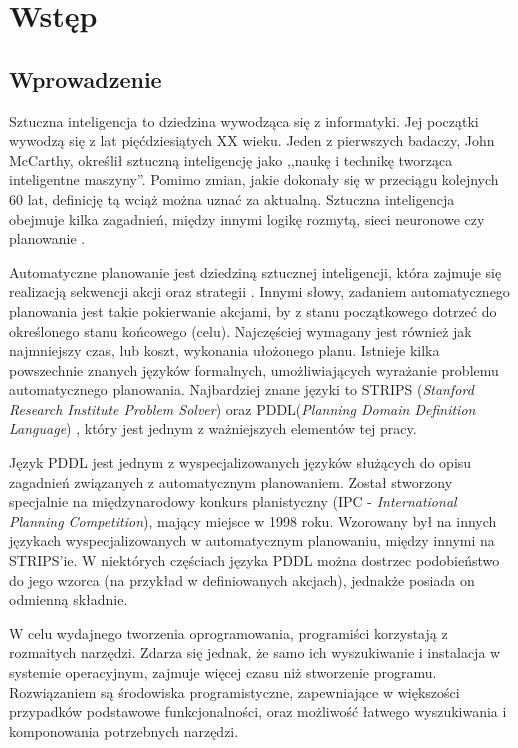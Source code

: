 \chapter{Wstęp}
\section{Wprowadzenie}
Sztuczna inteligencja to dziedzina wywodząca się z informatyki. Jej początki wywodzą się z lat pięćdziesiątych XX wieku. Jeden z pierwszych badaczy,  John McCarthy, określił sztuczną inteligencję jako ,,naukę i technikę tworząca inteligentne maszyny''. Pomimo zmian, jakie dokonały się w przeciągu kolejnych 60 lat, definicję tą wciąż można uznać za aktualną. Sztuczna inteligencja obejmuje kilka zagadnień, między innymi logikę rozmytą, sieci neuronowe czy planowanie \cite{ai}.

	Automatyczne planowanie jest dziedziną sztucznej inteligencji, która zajmuje się realizacją sekwencji akcji oraz strategii \cite{planning}. Innymi słowy, zadaniem automatycznego planowania jest takie pokierwanie akcjami, by z stanu początkowego dotrzeć do określonego stanu końcowego (celu). Najczęściej wymagany jest również jak najmniejszy czas, lub koszt, wykonania ułożonego planu. Istnieje kilka powszechnie znanych języków formalnych, umożliwiających wyrażanie problemu automatycznego planowania. Najbardziej znane języki to STRIPS (\textit{Stanford Research Institute Problem Solver}) \cite{strips} oraz PDDL(\textit{Planning Domain Definition Language}) \cite{pddl}, który jest jednym z ważniejszych elementów tej pracy.
	
	Język PDDL jest jednym z wyspecjalizowanych języków służących do opisu zagadnień związanych z automatycznym planowaniem. Został stworzony specjalnie na międzynarodowy konkurs planistyczny (IPC - \emph{International Planning Competition}), mający miejsce w 1998 roku. Wzorowany był na innych językach wyspecjalizowanych w automatycznym planowaniu, między innymi na STRIPS'ie. W niektórych częściach języka PDDL można dostrzec podobieństwo do jego wzorca (na przykład w definiowanych akcjach), jednakże posiada on odmienną składnie.   

W celu wydajnego tworzenia oprogramowania, programiści korzystają z rozmaitych narzędzi. Zdarza się jednak, że samo ich wyszukiwanie i instalacja w systemie operacyjnym, zajmuje więcej czasu niż stworzenie programu. Rozwiązaniem są środowiska programistyczne, zapewniające w większości przypadków podstawowe funkcjonalności, oraz możliwość łatwego wyszukiwania i komponowania potrzebnych narzędzi.

